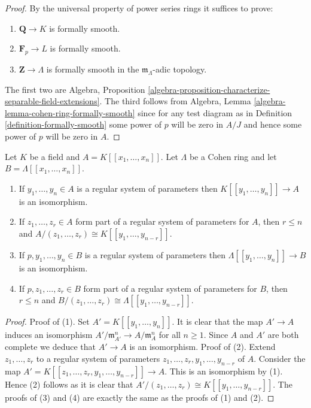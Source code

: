 \begin{proof}
By the universal property of power series rings it suffices to prove:
\begin{enumerate}
\item $\mathbf{Q} \to K$ is formally smooth.
\item $\mathbf{F}_p \to L$ is formally smooth.
\item $\mathbf{Z} \to \Lambda$ is formally smooth in the
$\mathfrak m_\Lambda$-adic topology.
\end{enumerate}
The first two are
Algebra, Proposition
\ref{algebra-proposition-characterize-separable-field-extensions}.
The third follows from
Algebra, Lemma \ref{algebra-lemma-cohen-ring-formally-smooth}
since for any test diagram as in Definition \ref{definition-formally-smooth}
some power of $p$ will be zero in $A/J$ and hence some power of $p$ will
be zero in $A$.
\end{proof}

\begin{lemma}
\label{lemma-quotient-power-series-ring-over-Cohen}
Let $K$ be a field and $A = K[[x_1, \ldots, x_n]]$.
Let $\Lambda$ be a Cohen ring and let $B = \Lambda[[x_1, \ldots, x_n]]$.
\begin{enumerate}
\item If $y_1, \ldots, y_n \in A$ is a regular system of parameters
then $K[[y_1, \ldots, y_n]] \to A$ is an isomorphism.
\item If $z_1, \ldots, z_r \in A$ form part of a regular system of
parameters for $A$, then $r \leq n$ and
$A/(z_1, \ldots, z_r) \cong K[[y_1, \ldots, y_{n - r}]]$.
\item If $p, y_1, \ldots, y_n \in B$ is a regular system of parameters
then $\Lambda[[y_1, \ldots, y_n]] \to B$ is an isomorphism.
\item If $p, z_1, \ldots, z_r \in B$ form part of a regular system of
parameters for $B$, then $r \leq n$ and
$B/(z_1, \ldots, z_r) \cong \Lambda[[y_1, \ldots, y_{n - r}]]$.
\end{enumerate}
\end{lemma}

\begin{proof}
Proof of (1). Set $A' = K[[y_1, \ldots, y_n]]$. It is clear that
the map $A' \to A$ induces an isomorphism
$A'/\mathfrak m_{A'}^n \to A/\mathfrak m_A^n$ for all $n \geq 1$.
Since $A$ and $A'$ are both complete we deduce that $A' \to A$ is an
isomorphism.
Proof of (2). Extend $z_1, \ldots, z_r$ to a regular system of parameters
$z_1, \ldots, z_r, y_1, \ldots, y_{n - r}$ of $A$. Consider the map
$A' = K[[z_1, \ldots, z_r, y_1, \ldots, y_{n - r}]] \to A$.
This is an isomorphism by (1). Hence (2) follows as it is clear that
$A'/(z_1, \ldots, z_r) \cong K[[y_1, \ldots, y_{n - r}]]$.
The proofs of (3) and (4) are exactly the same as the proofs of (1) and (2).
\end{proof}

